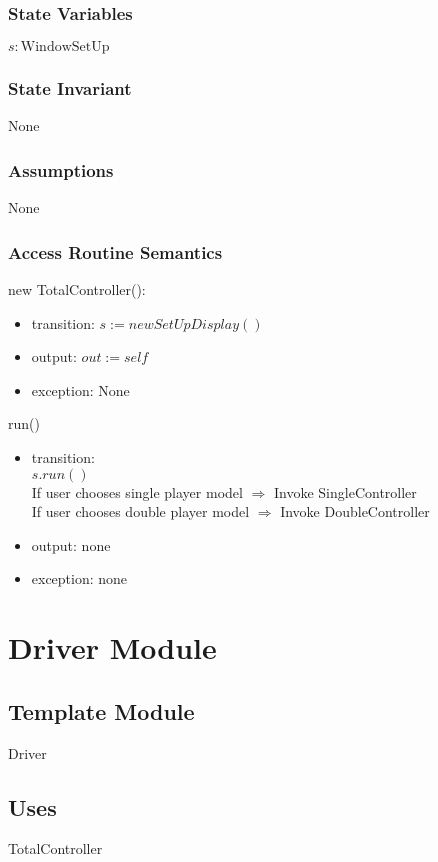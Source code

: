 \documentclass[12pt]{article}
\begin{document}
\subsubsection*{State Variables}
$s : \text{WindowSetUp}$
\subsubsection*{State Invariant}
None
\subsubsection*{Assumptions}
None
\subsubsection*{Access Routine Semantics}
\noindent new TotalController():
\begin{itemize}
\item transition: $s := new SetUpDisplay()$
\item output: $out := \mathit{self}$
\item exception: None
\end{itemize}

\noindent run()
\begin{itemize}
\item transition:\\
$s.run()$\\
If user chooses single player model $\Rightarrow$ Invoke SingleController\\
If user chooses double player model $\Rightarrow$ Invoke DoubleController\\
\item output: none
\item exception: none
\end{itemize}
\newpage

\section{Driver Module}

\subsection*{Template Module}
Driver

\subsection*{Uses}
TotalController
\end{document}
